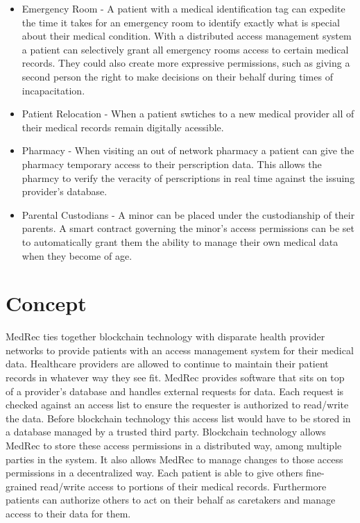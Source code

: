 \documentclass[a4paper]{article}
\begin{document}
\begin{itemize}

\item Emergency Room - A patient with a medical identification tag can expedite the time it takes for an emergency room to identify exactly what is special about their medical condition. With a distributed access management system a patient can selectively grant all emergency rooms access to certain medical records. They could also create more expressive permissions, such as giving a second person the right to make decisions on their behalf during times of incapacitation.

\item Patient Relocation - When a patient swtiches to a new medical provider all of their medical records remain digitally acessible.

\item Pharmacy - When visiting an out of network pharmacy a patient can give the pharmacy temporary access to their perscription data. This allows the pharmcy to verify the veracity of perscriptions in real time against the issuing provider's database.

\item Parental Custodians -  A minor can be placed under the custodianship of their parents. A smart contract governing the minor's access permissions can be set to automatically grant them the ability to manage their own medical data when they become of age.

\end{itemize}

\section{Concept}

MedRec ties together blockchain technology with disparate health provider networks to provide patients with an access management system for their medical data. Healthcare providers are allowed to continue to maintain their patient records in whatever way they see fit. MedRec provides software that sits on top of a provider's database and handles external requests for data. Each request is checked against an access list to ensure the requester is authorized to read/write the data. Before blockchain technology this access list would have to be stored in a database managed by a trusted third party. Blockchain technology allows MedRec to store these access permissions in a distributed way, among multiple parties in the system. It also allows MedRec to manage changes to those access permissions in a decentralized way. Each patient is able to give others fine-grained read/write access to portions of their medical records. Furthermore patients can authorize others to act on their behalf as caretakers and manage access to their data for them.
\end{document}
